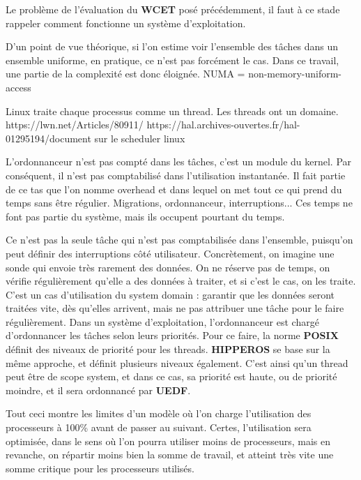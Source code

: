 	Le problème de l'évaluation du \textbf{WCET} posé précédemment, il faut à ce stade rappeler comment 
	fonctionne un système d'exploitation.
	
	D'un point de vue théorique, si l'on estime voir l'ensemble des tâches dans un ensemble uniforme, 
	en pratique, ce n'est pas forcément le cas. Dans ce travail, une partie de la complexité est 
	donc éloignée. NUMA = non-memory-uniform-access
	
	Linux traite chaque processus comme un thread. Les threads ont un domaine. 
	https://lwn.net/Articles/80911/
	https://hal.archives-ouvertes.fr/hal-01295194/document  sur le scheduler linux
	

	L'ordonnanceur n'est pas compté dans les tâches, c'est un module du kernel. Par conséquent, il n'est pas comptabilisé 
	dans l'utilisation instantanée. Il fait partie de ce tas que l'on nomme \og{}overhead\fg{} et dans lequel 
	on met tout ce qui prend du temps sans être régulier. 
	Migrations, ordonnanceur, interruptions... Ces temps ne font pas partie du système, mais ils occupent
	pourtant du temps.
	
	Ce n'est pas la seule tâche qui n'est pas comptabilisée dans l'ensemble, puisqu'on peut définir des 
	interruptions côté utilisateur. 
	Concrètement, on imagine une sonde qui envoie très rarement des données. On ne réserve 
	pas de temps, on vérifie régulièrement qu'elle a des données à traiter, et si c'est le cas, on les traite.\\
	C'est un cas d'utilisation du system domain : garantir que les données seront traitées vite, dès qu'elles arrivent, 
	mais ne pas attribuer une tâche pour le faire régulièrement.
	Dans un système d'exploitation, l'ordonnanceur est chargé d'ordonnancer les tâches selon leurs priorités. 
	Pour ce faire, la norme \textbf{POSIX} définit des niveaux de priorité pour les threads. 
	\textbf{HIPPEROS }se base sur la même approche, et définit plusieurs niveaux également. C'est ainsi 
	qu'un thread peut être de scope system, et dans ce cas, sa priorité est haute, ou de priorité 
	moindre, et il sera ordonnancé par \textbf{UEDF}.\newline
	
	Tout ceci montre les limites d'un modèle où l'on charge l'utilisation des processeurs à 100\% avant de 
	passer au suivant. Certes, l'utilisation sera optimisée, dans le sens où l'on 
	pourra utiliser moins de processeurs, mais en revanche, on 
	répartir moins bien la somme de travail, et atteint très vite une somme critique pour les processeurs utilisés.

